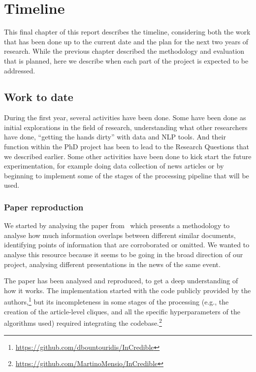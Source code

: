 \chapter{Timeline}
\label{chap:plan}

This final chapter of this report describes the timeline, considering both the work that has been done up to the current date and the plan for the next two years of research.
While the previous chapter described the methodology and evaluation that is planned, here we describe when each part of the project is expected to be addressed.

\section{Work to date}

During the first year, several activities have been done.
Some have been done as initial explorations in the field of research, understanding what other researchers have done, ``getting the hands dirty'' with data and NLP tools.
And their function within the PhD project has been to lead to the Research Questions that we described earlier.
Some other activities have been done to kick start the future experimentation, for example doing data collection of news articles or by beginning to implement some of the stages of the processing pipeline that will be used.


\subsection{Paper reproduction~\cite{bountouridis2018explaining}}
We started by analysing the paper from~\citet{bountouridis2018explaining} which presents a methodology to analyse how much information overlaps between different similar documents, identifying points of information that are corroborated or omitted.
We wanted to analyse this resource because it seems to be going in the broad direction of our project, analysing different presentations in the news of the same event.

The paper has been analysed and reproduced, to get a deep understanding of how it works. The implementation started with the code publicly provided by the authors,\footnote{\url{https://github.com/dbountouridis/InCredible}} but its incompleteness in some stages of the processing (e.g., the creation of the article-level cliques, and all the specific hyperparameters of the algorithms used) required integrating the codebase.\footnote{\url{https://github.com/MartinoMensio/InCredible}}

